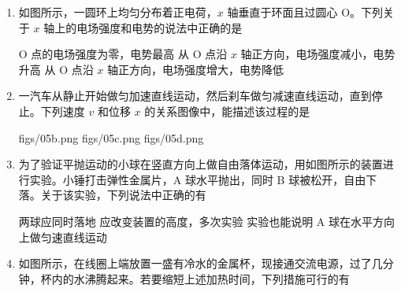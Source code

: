 \documentclass[\gkver]{gaokaozhenti}
\begin{document}
\begin{enumerate}
\item
如图所示，一圆环上均匀分布着正电荷，$x$ 轴垂直于环面且过圆心 O。下列关于 $x$ 轴上的电场强度和电势的说法中正确的是


{O 点的电场强度为零，电势最高}
{从 O 点沿 $x$ 轴正方向，电场强度减小，电势升高}
{从 O 点沿 $x$ 轴正方向，电场强度增大，电势降低}


\item
一汽车从静止开始做匀加速直线运动，然后刹车做匀减速直线运动，直到停止。下列速度 $v$ 和位移 $x$ 的关系图像中，能描述该过程的是

{figs/05b.png}
{figs/05c.png}
{figs/05d.png}


\item
为了验证平抛运动的小球在竖直方向上做自由落体运动，用如图所示的装置进行实验。小锤打击弹性金属片，A 球水平抛出，同时 B 球被松开，自由下落。关于该实验，下列说法中正确的有


{两球应同时落地}
{应改变装置的高度，多次实验}
{实验也能说明 A 球在水平方向上做匀速直线运动}



\item
如图所示，在线圈上端放置一盛有冷水的金属杯，现接通交流电源，过了几分钟，杯内的水沸腾起来。若要缩短上述加热时间，下列措施可行的有


\end{enumerate}
\end{document}
